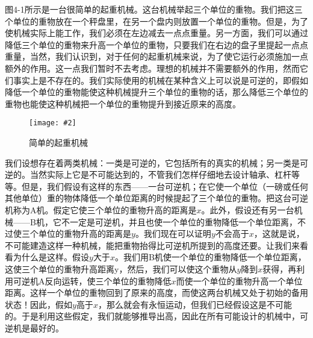 \documentclass[12pt,oneside]{book}
\newenvironment{fig}[2][1]
{\begin{figure}[H]
\centering
\texttt{[image: \#2]}}
{\end{figure}}
\begin{document}
图4-1所示是一台很简单的起重机械。这台机械举起三个单位的重物。我们把这三个单位的重物放在一个秤盘里，在另一个盘内则放置一个单位的重物。但是，为了使机械实际上能工作，我们必须在左边减去一点点重量。另一方面，我们可以通过降低三个单位的重物来升高一个单位的重物，只要我们在右边的盘子里提起一点点重量，当然，我们认识到，对于任何的起重机械来说，为了使它运行必须施加一点额外的作用。这一点我们暂时不去考虑。理想的机械并不需要额外的作用，然而它们事实上是不存在的。我们实际使用的机械在某种含义上可以说是可逆的，即假如降低一个单位的重物能使这种机械提升三个单位的重物的话，那么降低三个单位的重物也能使这种机械把一个单位的重物提升到接近原来的高度。
\begin{fig}{简单的起重机械}
\caption{简单的起重机械}
\label{fig:简单的起重机械}
\end{fig}
我们设想存在着两类机械：一类是可逆的，它包括所有的真实的机械；另一类是可逆的。当然实际上它是不可能达到的，不管我们怎样仔细地去设计轴承、杠杆等等。但是，我们假设有这样的东西——一台可逆机；在它使一个单位（一磅或任何其他单位）重的物体降低一个单位距离的时候提起了三个单位的重物。把这台可逆机称为A机。假定它使三个单位的重物升高的距离是$ x $。此外，假设还有另一台机械——B机，它不一定是可逆机，并且也使一个单位的重物降低一个单位距离，不过使三个单位的重物升高的距离是$ y $。我们现在可以证明$ y $不会高于$ x $，这就是说，不可能建造这样一种机械，能把重物抬得比可逆机所提到的高度还要。让我们来看看为什么是这样。假设$ y $大于$ x $。我们用B机使一个单位的重物降低一个单位距离，这使三个单位的重物升高距离y，然后，我们可以使这个重物从$ y $降到$ x $获得，再利用可逆机A反向运转，使三个单位的重物降低$ x $而使一个单位的重物升高一个单位距离。这样一个单位的重物回到了原来的高度，而使这两台机械又处于初始的备用状态！因此，假如$ y $高于$ x $，那么就会有永恒运动，但我们已经假设这是不可能的。于是利用这些假定，我们就能够推导出高，因此在所有可能设计的机械中，可逆机是最好的。
\end{document}
